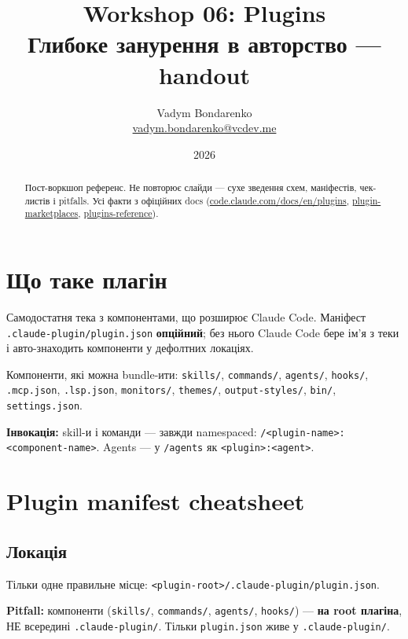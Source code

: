 \documentclass[11pt,a4paper]{article}
\title{%
  {\Huge\bfseries Workshop 06: Plugins}\\[0.6em]
  {\large Глибоке занурення в авторство --- handout}
}
\author{Vadym Bondarenko \\ \small\href{mailto:vadym.bondarenko@vcdev.me}{vadym.bondarenko@vcdev.me}}
\date{2026}
\begin{document}
\maketitle

\begin{abstract}
Пост-воркшоп референс. Не повторює слайди --- сухе зведення схем, маніфестів, чек-листів і pitfalls. Усі факти з офіційних docs (\href{https://code.claude.com/docs/en/plugins}{code.claude.com/docs/en/plugins}, \href{https://code.claude.com/docs/en/plugin-marketplaces}{plugin-marketplaces}, \href{https://code.claude.com/docs/en/plugins-reference}{plugins-reference}).
\end{abstract}

\tableofcontents
\newpage

\section{Що таке плагін}

Самодостатня тека з компонентами, що розширює Claude Code. Маніфест \texttt{.claude-plugin/plugin.json} \textbf{опційний}; без нього Claude Code бере ім'я з теки і авто-знаходить компоненти у дефолтних локаціях.

Компоненти, які можна bundle-ити: \texttt{skills/}, \texttt{commands/}, \texttt{agents/}, \texttt{hooks/}, \texttt{.mcp.json}, \texttt{.lsp.json}, \texttt{monitors/}, \texttt{themes/}, \texttt{output-styles/}, \texttt{bin/}, \texttt{settings.json}.

\textbf{Інвокація:} skill-и і команди --- завжди namespaced: \texttt{/<plugin-name>:<component-name>}. Agents --- у \texttt{/agents} як \texttt{<plugin>:<agent>}.

\section{Plugin manifest cheatsheet}

\subsection{Локація}

Тільки одне правильне місце: \texttt{<plugin-root>/.claude-plugin/plugin.json}.

\textbf{Pitfall:} компоненти (\texttt{skills/}, \texttt{commands/}, \texttt{agents/}, \texttt{hooks/}) --- \textbf{на root плагіна}, НЕ всередині \texttt{.claude-plugin/}. Тільки \texttt{plugin.json} живе у \texttt{.claude-plugin/}.
\end{document}

